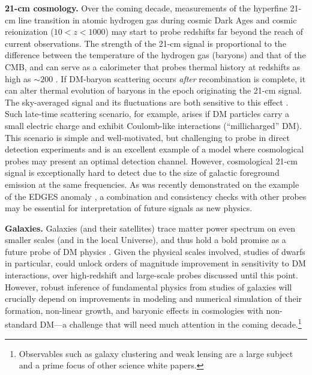 \documentclass[12pt]{article}
\begin{document}
\textbf{21-cm cosmology.} 
Over the coming decade, measurements of the hyperfine 21-cm line transition in atomic hydrogen gas during cosmic Dark Ages and cosmic reionization ($10<z<1000$) may start to probe redshifts far beyond the reach of current observations.
The strength of the 21-cm signal is proportional to the difference between the temperature of the hydrogen gas (baryons) and that of the CMB, and can serve as a calorimeter that probes thermal history at redshifts as high as $\sim 200$ \cite{Loeb_04, Breysse_18}.
If DM-baryon scattering occurs \textit{after} recombination is complete, it can alter thermal evolution of baryons in the epoch originating the 21-cm signal. 
The sky-averaged signal and its fluctuations are both sensitive to this effect \cite{Munoz_15, Barkana_18, Fialkov_18, Munoz_18}.
Such late-time scattering scenario, for example, arises if DM particles carry a small electric charge and exhibit Coulomb-like interactions (``millicharged'' DM).
This scenario is simple and well-motivated, but challenging to probe in direct detection experiments and is an excellent example of a model where cosmological probes may present an optimal detection channel.
However, cosmological 21-cm signal is exceptionally hard to detect due to the size of galactic foreground emission at the same frequencies. 
As was recently demonstrated on the example of the EDGES anomaly \cite{}, a combination and consistency checks with other probes may be essential for interpretation of future signals as new physics. 

\textbf{Galaxies.}
Galaxies (and their satellites) trace matter power spectrum on even smaller scales (and in the local Universe), and thus hold a bold promise as a future probe of DM physics \cite{2019arXiv190201055D}.
Given the physical scales involved, studies of dwarfs in particular, could unlock orders of magnitude improvement in sensitivity to DM interactions, over high-redshift and large-scale probes discussed until this point.
However, robust inference of fundamental physics from studies of galaxies will crucially depend on improvements in modeling and numerical simulation of their formation, non-linear growth, and baryonic effects in cosmologies with non-standard DM---a challenge that will need much attention in the coming decade.\footnote{Observables such as galaxy clustering and weak lensing are a large subject and a prime focus of other science white papers.}

\vspace{-0.3cm}
\end{document}
